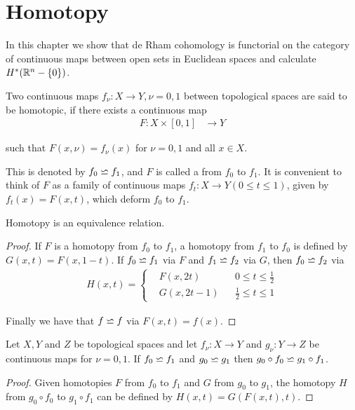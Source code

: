 \chapter{Homotopy}
In this chapter we show that de Rham cohomology is functorial on the category of continuous 
maps between open sets in Euclidean spaces and calculate $H^*({\mathbb{R}}^n - \{0\})$.

\begin{definition}
  Two continuous maps $f_\nu:X\to Y, \nu = 0,1$ between topological
spaces are said to be homotopic, if there exists a continuous map
\begin{align*}
  F:X\times [0,1] &\to Y
\end{align*}

such that $F(x, \nu) = f_\nu(x)$ for $\nu=0, 1$ and all $x\in X$.
\end{definition}


This is denoted by $f_0\backsimeq f_1$, and $F$ is called a  from $f_0$ to $f_1$. It is 
convenient to think of $F$ as a family of continuous maps $f_t:X\to Y (0\le t\le 1)$, given by $f_t(x) = F(x, t)$, 
which deform $f_0$ to $f_1$.


\begin{lemma}\label{lemma:6-2}
  Homotopy is an equivalence relation.
\end{lemma}

\begin{proof}
  If $F$ is a homotopy from $f_0$ to $f_1$, a homotopy from $f_1$ to $f_0$ is defined by $G(x, t) = F(x, 1-t)$.
  If $f_0\backsimeq f_1$ via $F$ and $f_1\backsimeq f_2$ via $G$, then $f_0\backsimeq f_2$ via 
  \begin{align*}
    H(x, t) = \left\{\begin{aligned}
      & F(x, 2t) && 0\le t\le \frac12\\
      & G(x, 2t-1) && \frac12\le t\le 1
    \end{aligned}\right.
  \end{align*}

  Finally we have that $f\backsimeq f$ via $F(x, t) = f(x)$.
\end{proof}

\begin{lemma}\label{lemma:6-3}
Let $X, Y$ and $Z$ be topological spaces and let $f_\nu:X\to Y$ and $g_\nu:Y\to Z$ be continuous maps for $\nu=0, 1$. If 
$f_0 \backsimeq f_1$ and $g_0\backsimeq g_1$ then $g_0\circ f_0\backsimeq g_1\circ f_1$.
\end{lemma}

\begin{proof}
  Given homotopies $F$ from $f_0$ to $f_1$ and $G$ from $g_0$ to $g_1$, the homotopy $H$
  from $g_0\circ f_0$ to $g_1\circ f_1$ can be defined by $H(x, t) = G(F(x, t), t)$.
\end{proof}


